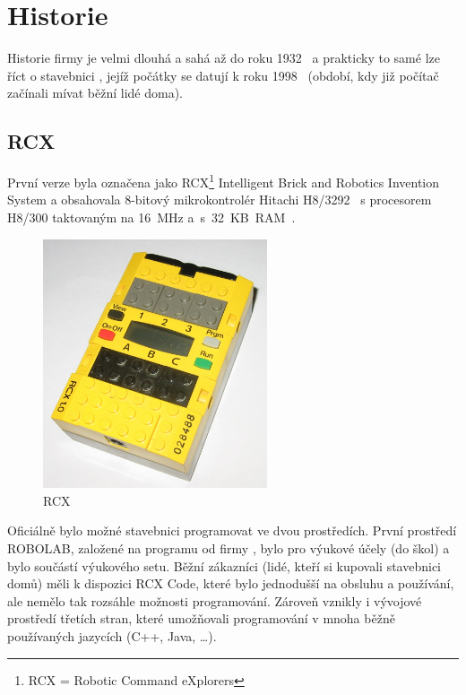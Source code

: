 \chapter{Historie \legoM}

Historie firmy \lego{ }je velmi dlouhá a sahá až do roku 1932~\cite{lego_GroupHistory1930s} a prakticky to samé lze říct o stavebnici \legoM, jejíž počátky se datují k roku 1998~\cite{lego_mindstormsHistory} (období, kdy již počítač začínali mívat běžní lidé doma).


\section{\legoM{ }RCX}

První verze byla označena jako \legoM{ }RCX\footnote{RCX = Robotic Command eXplorers} Intelligent Brick and Robotics Invention System a  obsahovala 8-bitový mikrokontrolér Hitachi H8/3292~\cite{hitachi_microcontrolerH8series} s procesorem H8/300 taktovaným na 16~MHz a~s~32~KB~RAM~\cite{legoMindstormsRCX_Manual}.

\begin{figure}[h]
	\centering
	\includegraphics[width=250px]{images/lego-mindstorms-rcx_wikipedia.jpg}
	\caption[\legoM{ }RCX]{\legoM{ }RCX\protect\footnotemark}
	\label{fig:lego-mindstorms-rcx-wikipedia}
\end{figure}


Oficiálně bylo možné stavebnici programovat ve dvou prostředích. První prostředí ROBOLAB, založené na programu \labview{ }od firmy \NI, bylo pro výukové účely (do škol) a bylo součástí výukového setu. 
Běžní zákazníci (lidé, kteří si kupovali stavebnici domů) měli k dispozici RCX Code, které bylo jednodušší na obsluhu a používání, ale nemělo tak rozsáhle možnosti programování. 
Zároveň vznikly i vývojové prostředí třetích stran, které umožňovali programování v mnoha běžně používaných jazycích (C++, Java, \dots).

